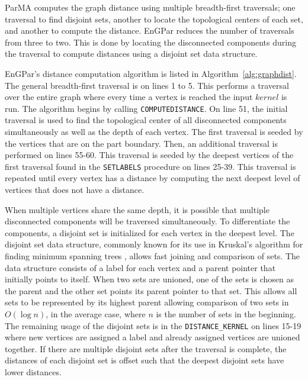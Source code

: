 ParMA computes the graph distance using multiple breadth-first traversals; one
traversal to find disjoint sets, another to locate the topological centers of
each set, and another to compute the distance.
EnGPar reduces the number of traversals from three to two. This
is done by locating the disconnected components during the
traversal to compute distances using a disjoint set data structure.

EnGPar's distance computation algorithm is listed in
Algorithm~\ref{alg:graphdist}. The general breadth-first
traversal is on lines 1 to 5. This performs a
traversal over the entire graph where every time a vertex
is reached the input $kernel$ is run. The algorithm begins
by calling \texttt{COMPUTEDISTANCE}. On line 51, the initial
traversal is used to find the topological center of all
disconnected components simultaneously as well as
the depth of each vertex. The first traversal is seeded
by the vertices that are on the part boundary. Then, an
additional traversal is performed on lines 55-60. This traversal is seeded
by the deepest vertices of the first traversal found
in the \texttt{SETLABELS} procedure on lines 25-39. This
traversal is repeated until every vertex has a
distance by computing the next deepest level of vertices
that does not have a distance.

When multiple vertices share the same depth,
it is possible that multiple disconnected components will
be traversed simultaneously. To differentiate the
components, a disjoint set  is initialized for each
vertex in the deepest level. The disjoint set data
structure, commonly known for its use in Kruskal's
algorithm for finding minimum spanning trees \cite{disjointset}, allows fast joining
and comparison of sets. The data structure consists of a label for each vertex
and a parent pointer that initially points to itself. When two sets are unioned,
one of the sets is chosen as the parent and the other set points its parent
pointer to that set. This allows all sets to be represented by its highest
parent allowing comparison of two sets in $O(\log{n})$, in the average case,
where $n$ is the number of sets in the beginning. The
remaining usage of the disjoint sets
is in the \texttt{DISTANCE\_KERNEL} on lines 15-19 where new vertices are assigned
a label and already assigned vertices are unioned together. If there are
multiple disjoint sets after the traversal is complete,
the distances of each disjoint
set is offset such that the deepest disjoint sets have lower distances.

